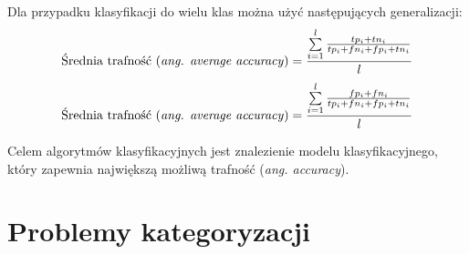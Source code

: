 Dla przypadku klasyfikacji do wielu klas można użyć następujących generalizacji\cite{SOKOLOVA09}:
\begin{equation}
\label{cm_accuracy_multi} 
\text{Średnia trafność (\emph{ang. average accuracy})} = \frac{\sum\limits_{i=1}^l \frac{tp_i + tn_i}{tp_i + fn_i + fp_i + tn_i}}{l}
\end{equation}
\begin{equation}
\label{cm_error_multi} 
\text{Średnia trafność (\emph{ang. average accuracy})} = \frac{\sum\limits_{i=1}^l \frac{fp_i + fn_i}{tp_i + fn_i + fp_i + tn_i}}{l}
\end{equation}

Celem algorytmów klasyfikacyjnych jest znalezienie modelu klasyfikacyjnego, który zapewnia największą możliwą trafność (\emph{ang. accuracy}).

\section{Problemy kategoryzacji}

